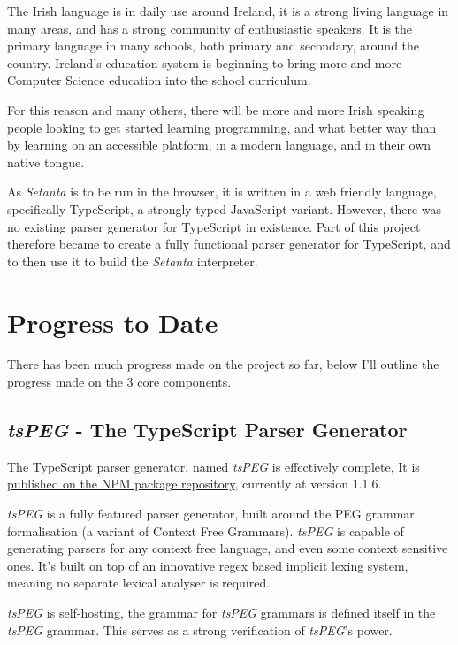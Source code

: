 \documentclass[11pt]{extarticle}
\newcommand{\Setanta}{\emph{Setanta}}
\newcommand{\tsPEG}{\emph{tsPEG}}
\begin{document}
        The Irish language is in daily use around Ireland, it is a strong living language in many areas, and has a strong community of enthusiastic speakers. It is the primary language in many schools, both primary and secondary, around the country. Ireland's education system is beginning to bring more and more Computer Science education into the school curriculum.
        
        For this reason and many others, there will be more and more Irish speaking people looking to get started learning programming, and what better way than by learning on an accessible platform, in a modern language, and in their own native tongue.

        As \Setanta{} is to be run in the browser, it is written in a web friendly language, specifically TypeScript, a strongly typed JavaScript variant. However, there was no existing parser generator for TypeScript in existence. Part of this project therefore became to create a fully functional parser generator for TypeScript, and to then use it to build the \Setanta{} interpreter.

    \section*{Progress to Date}

        There has been much progress made on the project so far, below I'll outline the progress made on the 3 core components.

        \subsection*{\tsPEG{} - The TypeScript Parser Generator}

            The TypeScript parser generator, named \tsPEG{} is effectively complete, It is \href{https://www.npmjs.com/package/tspeg}{published on the NPM package repository}, currently at version 1.1.6.

            \tsPEG{} is a fully featured parser generator, built around the PEG grammar formalisation (a variant of Context Free Grammars). \tsPEG{} is capable of generating parsers for any context free language, and even some context sensitive ones. It's built on top of an innovative regex based implicit lexing system, meaning no separate lexical analyser is required.

            \tsPEG{} is self-hosting, the grammar for \tsPEG{} grammars is defined itself in the \tsPEG{} grammar. This serves as a strong verification of \tsPEG{}'s power.
\end{document}
